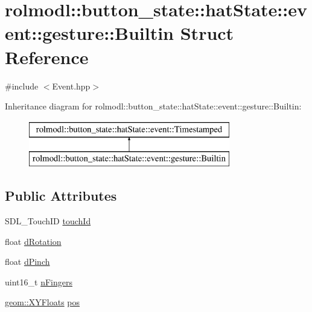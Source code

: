 \hypertarget{structrolmodl_1_1button__state_1_1hat_state_1_1event_1_1gesture_1_1_builtin}{}\section{rolmodl\+::button\+\_\+state\+::hat\+State\+::event\+::gesture\+::Builtin Struct Reference}
\label{structrolmodl_1_1button__state_1_1hat_state_1_1event_1_1gesture_1_1_builtin}


{\ttfamily \#include $<$Event.\+hpp$>$}

Inheritance diagram for rolmodl\+::button\+\_\+state\+::hat\+State\+::event\+::gesture\+::Builtin\+:\begin{figure}[H]
\begin{center}
\leavevmode
\includegraphics[height=2.000000cm]{structrolmodl_1_1button__state_1_1hat_state_1_1event_1_1gesture_1_1_builtin}
\end{center}
\end{figure}
\subsection*{Public Attributes}
\begin{DoxyCompactItemize}
\item 
S\+D\+L\+\_\+\+Touch\+ID \mbox{\hyperlink{structrolmodl_1_1button__state_1_1hat_state_1_1event_1_1gesture_1_1_builtin_a7e3bc2ff0238c4c4d80cf31f17f38fe2}{touch\+Id}}
\item 
float \mbox{\hyperlink{structrolmodl_1_1button__state_1_1hat_state_1_1event_1_1gesture_1_1_builtin_aa1d2a00688d327dcf38146c0610d52ad}{d\+Rotation}}
\item 
float \mbox{\hyperlink{structrolmodl_1_1button__state_1_1hat_state_1_1event_1_1gesture_1_1_builtin_afb9a1f35f82869999afde793cc38388b}{d\+Pinch}}
\item 
uint16\+\_\+t \mbox{\hyperlink{structrolmodl_1_1button__state_1_1hat_state_1_1event_1_1gesture_1_1_builtin_ac7ae2f6e691dad75968605f6a2c8065d}{n\+Fingers}}
\item 
\mbox{\hyperlink{structrolmodl_1_1geom_1_1_x_y_floats}{geom\+::\+X\+Y\+Floats}} \mbox{\hyperlink{structrolmodl_1_1button__state_1_1hat_state_1_1event_1_1gesture_1_1_builtin_a3aa81cc88bd1ec4d5b3811e0258b9396}{pos}}
\end{DoxyCompactItemize}


